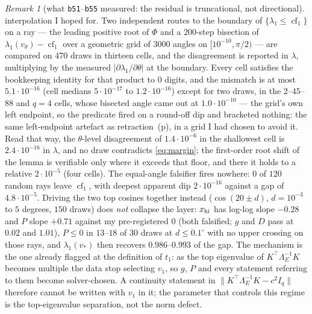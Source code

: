 \documentclass[11pt]{article}
\theoremstyle{remark}
\newtheorem{remark}{Remark}[section]
\newcommand{\Le}{\Lambda_E}
\begin{document}
\begin{remark}[what \texttt{b51}--\texttt{b55} measured: the residual is truncational, not directional]
{interpolation I hoped for.} Two independent routes to the boundary of $\{\lambda_1\le\operatorname{cf}_1\}$
on a ray --- the leading positive root of $\Phi$ and a $200$-step bisection of
$\lambda_1(v_\theta)-\operatorname{cf}_1$ over a geometric grid of $3000$ angles on
$[10^{-10},\pi/2)$ --- are compared on $470$ draws in thirteen cells, and the disagreement is reported
in $\lambda$, multiplying by the measured $|\partial\lambda_1/\partial\theta|$ at the boundary. Every
cell satisfies the bookkeeping identity for that product to $0$ digits, and the mismatch is at most
$5.1\cdot10^{-16}$ (cell medians $5\cdot10^{-17}$ to $1.2\cdot10^{-16}$) except for two draws, in the
$2$--$45$--$88$ and $q=4$ cells, whose bisected angle came out at $1.0\cdot10^{-10}$ --- the grid's own
left endpoint, so the predicate fired on a round-off dip and bracketed nothing: the same left-endpoint
artefact as retraction~(p), in a grid I had chosen to avoid it. Read that way, the $\theta$-level
disagreement of $1.4\cdot10^{-6}$ in the shallowest cell is $2.4\cdot10^{-16}$ in $\lambda$, and no
draw contradicts \eqref{eq:margin}; the first-order root shift of the lemma is verifiable only where it
exceeds that floor, and there it holds to a relative $2\cdot10^{-5}$ (four cells).
The equal-angle falsifier fires nowhere: $0$ of $120$ random rays leave $\operatorname{cf}_1$, with
deepest apparent dip $2\cdot10^{-16}$ against a gap of $4.8\cdot10^{-5}$.
Driving the two top cosines together instead ($\cos(20\pm d)$, $d=10^{-3}$ to $5$ degrees, $150$
draws) does \emph{not} collapse the layer: $x_{\rm hi}$ has log-log slope $-0.28$ and $P$ slope $+0.71$
against my pre-registered $0$ (both falsified; $g$ and $D$ pass at $0.02$ and $1.01$), $P\le0$ in
$13$--$18$ of $30$ draws at $d\le0.1^\circ$ with no upper crossing on those rays, and
$\lambda_1(v_\ast)$ then recovers $0.986$--$0.993$ of the gap. The mechanism is the one already flagged
at the definition of $t_1$: as the top eigenvalue of $K^{\top}\Le^{-1}K$ becomes multiple the data stop
selecting $v_1$, so $g$, $P$ and every statement referring to them become solver-chosen. A continuity
statement in $\|K^{\top}\Le^{-1}K-c^{2}I_q\|$ therefore cannot be written with $v_1$ in it; the
parameter that controls this regime is the top-eigenvalue separation, not the norm defect.


\end{remark}
\end{document}
